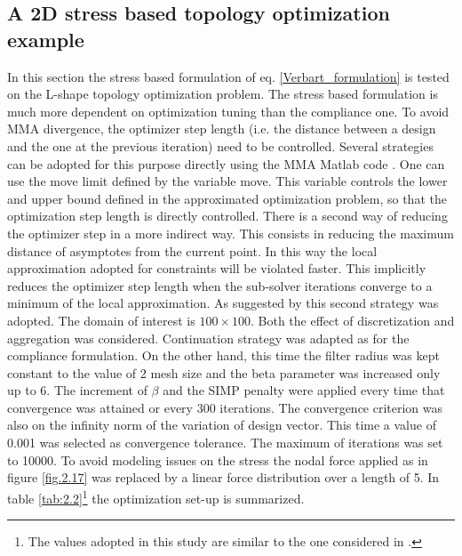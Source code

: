 \subsection{A 2D stress based topology optimization example}
In this section the stress based formulation of eq. \ref{Verbart_formulation} is tested on the L-shape topology optimization problem. The stress based formulation is much more dependent on optimization tuning than the compliance one. To avoid MMA divergence, the optimizer step length (i.e. the distance between a design and the one at the previous iteration) need to be controlled. Several strategies can be adopted for this purpose directly using the MMA Matlab code \cite{svanberg1987method}. One can use the move limit defined by the variable move. This variable controls the lower and upper bound defined in the approximated optimization problem, so that the optimization step length is directly controlled. There is a second way of reducing the optimizer step in a more indirect way. This consists in reducing the maximum distance of asymptotes from the current point. In this way the local approximation adopted for constraints will be violated faster. This implicitly reduces the optimizer step length when the sub-solver iterations converge to a minimum of the local approximation. As suggested by \cite{verbart2017unified} this second strategy was adopted. The domain of interest is $100\times100$. Both the effect of discretization and aggregation was considered.
Continuation strategy was adapted as for the compliance formulation. On the other hand, this time the filter radius was kept constant to the value of 2 mesh size and the beta parameter was increased only up to 6. The increment of $\beta$ and the SIMP penalty were applied every time that convergence was attained or every 300 iterations. The convergence criterion was also on the infinity norm of the variation of design vector. This time a value of 0.001 was selected as convergence tolerance. The maximum of iterations was set to 10000. To avoid modeling issues on the stress the nodal force applied as in figure \ref{fig.2.17} was replaced by a linear force distribution over a length of 5. In table \ref{tab:2.2}\footnote{The values adopted in this study are similar to the one considered in \cite{verbart2017unified}.} the optimization set-up is summarized.

